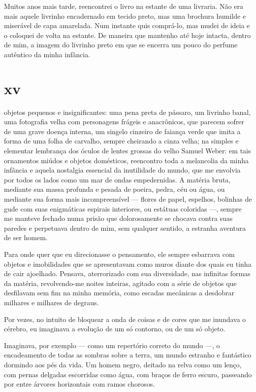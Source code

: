 Muitos anos mais tarde, reencontrei o livro na estante de uma livraria. Não
era mais aquele livrinho encadernado em tecido preto, mas uma brochura
humilde e miserável de capa amarelada. Num instante quis comprá-lo, mas mudei
de ideia e o coloquei de volta na estante. De maneira que mantenho até hoje
intacta, dentro de mim, a imagem do livrinho preto em que se encerra um pouco
do perfume autêntico da minha infância.


\section{xv} 

 objetos pequenos e insignificantes: uma pena preta de pássaro, um
 livrinho banal, uma fotografia velha com personagens frágeis e anacrônicos,
 que parecem sofrer de uma grave doença interna, um singelo cinzeiro de
 faiança verde que imita a forma de uma folha de carvalho, sempre cheirando a
 cinza velha; na simples e elementar lembrança dos óculos de lentes grossas
 do velho Samuel Weber: em tais ornamentos miúdos e objetos domésticos,
 reencontro toda a melancolia da minha infância e aquela nostalgia essencial
 da inutilidade do mundo, que me envolvia por todos os lados como um mar de
 ondas empedernidas. A matéria bruta, mediante sua massa profunda e pesada de
 poeira, pedra, céu ou água, ou mediante sua forma mais incompreensível ---
 flores de papel, espelhos, bolinhas de gude com suas enigmáticas espirais
 interiores, ou estátuas coloridas ---, sempre me manteve fechado numa prisão
 que dolorosamente se chocava contra suas paredes e perpetuava dentro de mim,
 sem qualquer sentido, a estranha aventura de ser homem.

Para onde quer que eu direcionasse o pensamento, ele sempre esbarrava com
objetos e imobilidades que se apresentavam como muros diante dos quais eu
tinha de cair ajoelhado. Pensava, aterrorizado com sua diversidade, nas
infinitas formas da matéria, revolvendo-me noites inteiras, agitado com a
série de objetos que desfilavam sem fim na minha memória, como escadas
mecânicas a desdobrar milhares e milhares de degraus.

Por vezes, no intuito de bloquear a onda de coisas e de cores que me inundava
o cérebro, eu imaginava a evolução de um só contorno, ou de um só objeto.

Imaginava, por exemplo --- como um repertório correto do mundo ---, o
encadeamento de todas as sombras sobre a terra, um mundo estranho e
fantástico dormindo aos pés da vida. Um homem negro, deitado na relva como um
lenço, com pernas delgadas escorridas como água, com braços de ferro escuro,
passeando por entre árvores horizontais com ramos chorosos.

